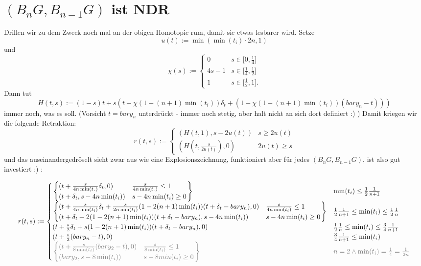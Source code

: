 \documentclass[11pt,twoside,a4paper]{scrbook} %
\begin{document}
\section{$(B_nG,B_{n-1}G)$ ist NDR}
Drillen wir zu dem Zweck noch mal an der obigen Homotopie rum, damit sie etwas lesbarer wird. Setze $$u(t) := \min(\min(t_i)\cdot2n,1)$$ und 
$$\chi(s):=\begin{cases}0 & s\in\lbrack0,\frac14\rbrack\\4s-1&s\in\lbrack \frac14,\frac12\rbrack\\1&s\in\lbrack\frac12,1\rbrack. \end{cases}$$
Dann tut $$H(t,s):=(1-s)t + s(t+\chi(1-(n+1)\min(t_i))\delta_t+(1-\chi(1-(n+1)\min(t_i))(bary_n-t)))$$
immer noch, was es soll. (Vorsicht $t=bary_n$ unterdrückt - immer noch stetig, aber halt nicht an sich dort definiert :) ) Damit kriegen wir die folgende Retraktion:
$$r(t,s):=\begin{cases}(H(t,1),s-2u(t)) & s\geq2u(t)\\(H(t,\frac{s}{2u(t)}),0)&2u(t)\geq s\end{cases}$$
und das auseinandergedr\"oselt sieht zwar aus wie eine Explosionszeichnung, funktioniert aber f\"ur jedes $(B_nG,B_{n-1}G)$, ist also gut investiert :) :
\begin{landscape}
$$r(t,s):=\begin{cases}
                       \left.\begin{cases}(t+\frac{s}{4n\min(t_i)}\delta_t,0)&\frac{s}{4n\min(t_i)}\leq1\\
                                    (t+\delta_t,s-4n\min(t_i))&s-4n\min(t_i)\geq 0\end{cases}\right\}
                           &\min(t_i)\leq\frac12\frac1{n+1}\\
		       \left.\begin{cases}(t+\frac{s}{4n\min(t_i)}\delta_t+\frac{s}{2n\min(t_i)}(1-2(n+1)\min(t_i))(t+\delta_t-bary_n),0)&\frac{s}{4n\min(t_i)}\leq1\\
                                    (t+\delta_t+2(1-2(n+1)\min(t_i))(t+\delta_t-bary_n),s-4n\min(t_i))&s-4n\min(t_i)\geq0\end{cases}\right\}
                           &\frac12\frac1{n+1} \leq\min(t_i)\leq\frac12\frac1{n}\\
                             (t+\frac{s}2\delta_t+s(1-2(n+1)\min(t_i))(t+\delta_t-bary_n),0)
                           &\frac12\frac1{n}\leq \min(t_i)\leq\frac34\frac1{n+1}\\
			     (t+\frac{s}2(bary_n-t),0)
                           &\frac34\frac1{n+1}\leq\min(t_i)\\
\textcolor{gray}{ \left.\begin{cases}(t+\frac{s}{8\min(t_i)}(bary_2-t),0)&\frac{s}{8\min(t_i)}\leq1\\
                                    (bary_2,s-8\min(t_i))&s-8min(t_i)\geq0\end{cases}\right\}}
       &\textcolor{gray}{
                        n=2\wedge \min(t_i)=\frac14=\frac1{2n}
                             }\\
           \end{cases}$$
\end{landscape}
\end{document}
